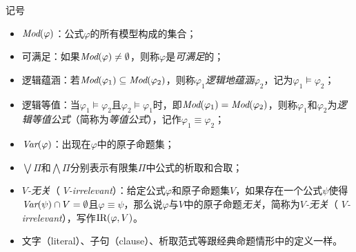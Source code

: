 \documentclass[9pt, CJK]{beamer}
\begin{document}
\begin{frame}
{{\begin{block}{记号}
		\begin{itemize}
			\item $\textit{Mod}(\varphi)$：公式$\varphi$的所有模型构成的集合；
			\item 可满足：如果$\textit{Mod}(\varphi)\not = \emptyset$，则称$\varphi$是\emph{可满足}的；
			\item 逻辑蕴涵：若$\textit{Mod}(\varphi_1)\subseteq \textit{Mod}(\varphi_2)$，则称$\varphi_1$\emph{逻辑地蕴涵}$\varphi_2$，记为$\varphi_1\models \varphi_2$；
			\item 逻辑等值：当$\varphi_1\models \varphi_2$且$\varphi_2\models \varphi_1$时，即$\textit{Mod}(\varphi_1)= \textit{Mod}(\varphi_2)$，则称$\varphi_1$和$\varphi_2$为\emph{逻辑等值公式}（简称为\emph{等值公式}），记作$\varphi_1 \equiv \varphi_2$；
			\item $\textit{Var}(\varphi)$：出现在$\varphi$中的原子命题集；
			\item $\bigvee \Pi$和$\bigwedge \Pi$分别表示有限集$\Pi$中公式的析取和合取；
			\item \emph{$V$-无关}（ \emph{$V$-irrelevant}）：给定公式$\varphi$和原子命题集$V$，如果存在一个公式$\psi$使得$\textit{Var}(\psi) \cap V = \emptyset$且$\varphi \equiv \psi$，那么说$\varphi$与$V$中的原子命题\emph{无关}，简称为\emph{$V$-无关}（ \emph{$V$-irrelevant}），写作$\textrm{IR}(\varphi,V)$。 
			\item 文字（literal）、子句（clause）、析取范式等跟经典命题情形中的定义一样。
		\end{itemize}
	\end{block}
}
	}
\end{frame}
\end{document}
